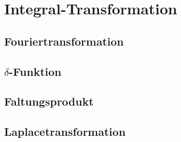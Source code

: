 \section{Integral-Transformation}
\subsection[Fouriertransformation]{Fouriertransformation}

\subsection[$\delta$-Funktion]{$\delta$-Funktion}

\subsection[Faltungsprodukt]{Faltungsprodukt}

\subsection[Laplacetransformation]{Laplacetransformation}

